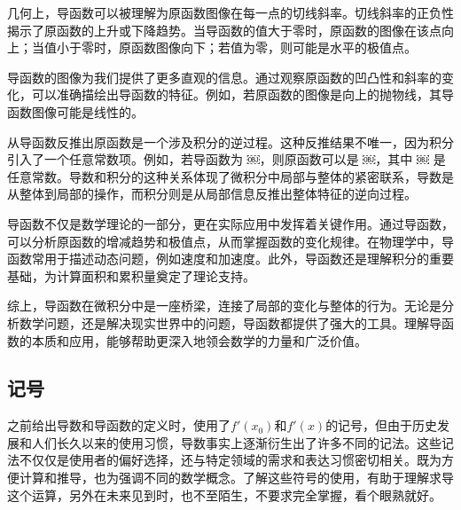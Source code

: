 几何上，导函数可以被理解为原函数图像在每一点的切线斜率。切线斜率的正负性揭示了原函数的上升或下降趋势。当导函数的值大于零时，原函数的图像在该点向上；当值小于零时，原函数图像向下；若值为零，则可能是水平的极值点。

导函数的图像为我们提供了更多直观的信息。通过观察原函数的凹凸性和斜率的变化，可以准确描绘出导函数的特征。例如，若原函数的图像是向上的抛物线，其导函数图像可能是线性的。

从导函数反推出原函数是一个涉及积分的逆过程。这种反推结果不唯一，因为积分引入了一个任意常数项。例如，若导函数为 ￼，则原函数可以是 ￼，其中 ￼ 是任意常数。导数和积分的这种关系体现了微积分中局部与整体的紧密联系，导数是从整体到局部的操作，而积分则是从局部信息反推出整体特征的逆向过程。

导函数不仅是数学理论的一部分，更在实际应用中发挥着关键作用。通过导函数，可以分析原函数的增减趋势和极值点，从而掌握函数的变化规律。在物理学中，导函数常用于描述动态问题，例如速度和加速度。此外，导函数还是理解积分的重要基础，为计算面积和累积量奠定了理论支持。

综上，导函数在微积分中是一座桥梁，连接了局部的变化与整体的行为。无论是分析数学问题，还是解决现实世界中的问题，导函数都提供了强大的工具。理解导函数的本质和应用，能够帮助更深入地领会数学的力量和广泛价值。


\subsection{记号}

之前给出导数和导函数的定义时，使用了$f'(x_0)$和$f'(x)$的记号，但由于历史发展和人们长久以来的使用习惯，导数事实上逐渐衍生出了许多不同的记法。这些记法不仅仅是使用者的偏好选择，还与特定领域的需求和表达习惯密切相关。既为方便计算和推导，也为强调不同的数学概念。了解这些符号的使用，有助于理解求导这个运算，另外在未来见到时，也不至陌生，不要求完全掌握，看个眼熟就好。

